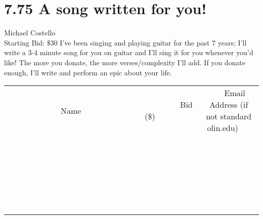 \documentclass[11pt]{article}
\begin{document}
\section*{7.75 A song written for you!}
Michael Costello
\\
Starting Bid: \$30
\newline
I've been singing and playing guitar for the past 7 years; I'll write a 3-4 minute song for you on guitar and I'll sing it for you whenever you'd like!
The more you donate, the more verses/complexity I'll add. If you donate enough, I'll write and perform an epic about your life.
\\[6ex]
\begin{tabular}{c c c}
~~~~~~~~~~~~~Name~~~~~~~~~~~~~ & ~~~~~~~~~Bid (\$)~~~~~~~~~  & ~~~Email Address (if not standard olin.edu)~~~\\
 & & \\
\hline
 & & \\
\hline
 & & \\
\hline
 & & \\
\hline
 & & \\
\hline
 & & \\
\hline
 & & \\
\hline
 & & \\
\hline
 & & \\
\hline
 & & \\
\hline
 & & \\
\hline
 & & \\
\hline
 & & \\
\hline
 & & \\
\hline
 & & \\
\hline
 & & \\
\hline
 & & \\
\hline
 & & \\
\hline
 & & \\
\hline
 & & \\
\hline
 & & \\
\hline
 & & \\
\hline
 & & \\
\hline
 & & \\
\hline
 & & \\
\hline
 & & \\
\hline
\end{tabular}
\newpage
\end{document}
